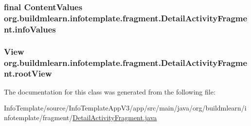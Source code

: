 \subsubsection[{\texorpdfstring{info\+Values}{infoValues}}]{\setlength{\rightskip}{0pt plus 5cm}final Content\+Values org.\+buildmlearn.\+infotemplate.\+fragment.\+Detail\+Activity\+Fragment.\+info\+Values\hspace{0.3cm}{\ttfamily [private]}}\hypertarget{classorg_1_1buildmlearn_1_1infotemplate_1_1fragment_1_1DetailActivityFragment_a02dff9580f9d5cbf3371fea62d1c2e6d}{}\label{classorg_1_1buildmlearn_1_1infotemplate_1_1fragment_1_1DetailActivityFragment_a02dff9580f9d5cbf3371fea62d1c2e6d}
\subsubsection[{\texorpdfstring{root\+View}{rootView}}]{\setlength{\rightskip}{0pt plus 5cm}View org.\+buildmlearn.\+infotemplate.\+fragment.\+Detail\+Activity\+Fragment.\+root\+View\hspace{0.3cm}{\ttfamily [private]}}\hypertarget{classorg_1_1buildmlearn_1_1infotemplate_1_1fragment_1_1DetailActivityFragment_a75cbe5a1b3270fda83663c3eae591fcb}{}\label{classorg_1_1buildmlearn_1_1infotemplate_1_1fragment_1_1DetailActivityFragment_a75cbe5a1b3270fda83663c3eae591fcb}


The documentation for this class was generated from the following file\+:\begin{DoxyCompactItemize}
\item 
Info\+Template/source/\+Info\+Template\+App\+V3/app/src/main/java/org/buildmlearn/infotemplate/fragment/\hyperlink{InfoTemplate_2source_2InfoTemplateAppV3_2app_2src_2main_2java_2org_2buildmlearn_2infotemplate_2f97fa1c29ed126df6b9893c55cb59dfb1}{Detail\+Activity\+Fragment.\+java}\end{DoxyCompactItemize}
